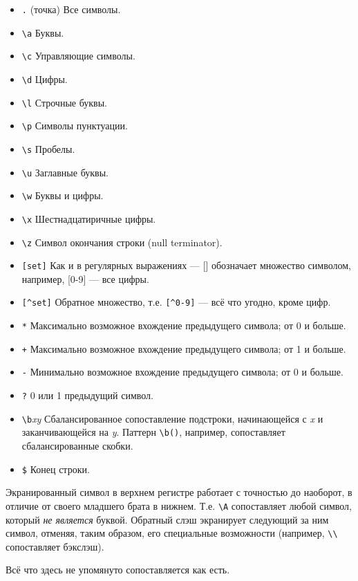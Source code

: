 \begin{itemize}
\item \verb|.| (точка) Все символы.
\item \verb|\a| Буквы.
\item \verb|\c| Управляющие символы.
\item \verb|\d| Цифры.
\item \verb|\l| Строчные буквы.
\item \verb|\p| Символы пунктуации.
\item \verb|\s| Пробелы.
\item \verb|\u| Заглавные буквы.
\item \verb|\w| Буквы и цифры.
\item \verb|\x| Шестнадцатиричные цифры.
\item \verb|\z| Символ окончания строки (null terminator).
\item \verb|[set]| Как и в регулярных выражениях --- [] обозначает
множество символом, например, [0-9] --- все цифры.
\item \verb|[^set]| Обратное множество, т.е. \verb|[^0-9]| --- всё что
угодно, кроме цифр.
\item \verb|*| Максимально возможное вхождение предыдущего символа; от
0 и больше.
\item \verb|+| Максимально возможное вхождение предыдущего символа; от
1 и больше.
\item \verb|-| Минимально возможное вхождение предыдущего символа; от
0 и больше.
\item \verb|?| 0 или 1 предыдущий символ.
\item \verb|\b|\emph{xy} Сбалансированное сопоставление подстроки,
начинающейся с \emph{x} и заканчивающейся на \emph{y}. Паттерн
\verb|\b()|, например, сопоставляет сбалансированные скобки.
\item \verb|$| Конец строки.
\end{itemize}

Экранированный символ в верхнем регистре работает с точностью до
наоборот, в отличие от своего младшего брата в нижнем. Т.е. \verb|\A| сопоставляет
любой символ, который \emph{не является} буквой. Обратный слэш
экранирует следующий за ним символ, отменяя, таким образом, его
специальные возможности (например, \verb|\\| сопоставляет бэкслэш).

Всё что здесь не упомянуто сопоставляется как есть.

